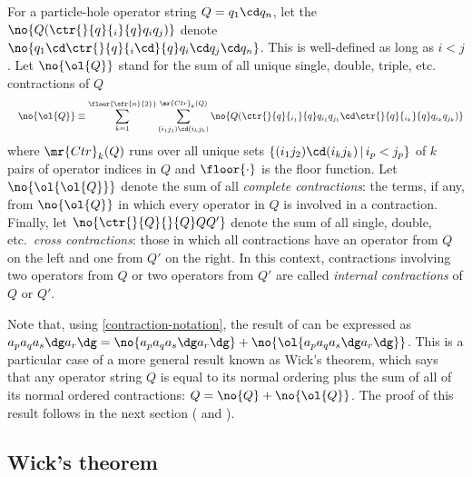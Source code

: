 \documentclass[11pt,fleqn]{article}
\numberwithin{equation}{section}
\begin{document}
\begin{ntt}\label{contraction-notation}
For a particle-hole operator string $Q=q_1\cd q_n$, let the $\no{Q(\ctr{}{q}{_i}{q}q_iq_j)}$ denote $\no{q_1\cd\ctr{}{q}{_i\cd}{q}q_i\cd q_j\cd q_n}$.
This is well-defined as long as $i<j$.
Let $\no{\ol{Q}}$ stand for the sum of all unique single, double, triple, etc. contractions of $Q$
\begin{align*}
&&
  \no{\ol{Q}}
\equiv
  \sum_{k=1}^{\floor{\sfr{n}{2}}}
  \sum_{(i_1j_1)\cd(i_kj_k)}^{\mr{Ctr}_k(Q)}
  \no{Q(
    \ctr{}{q}{_{i_1}}{q}
    q_{i_1}q_{j_1}
    \cd
    \ctr{}{q}{_{i_k}}{q}
    q_{i_k}q_{j_k}
  )}
\end{align*}
where $\mr{Ctr}_k(Q)$ runs over all unique sets $\{(i_1j_2)\cd(i_kj_k)\,|\,i_p<j_p\}$ of $k$ pairs of operator indices in $Q$ and $\floor{\cdot}$ is the floor function.
Let $\no{\ol{\ol{Q}}}$ denote the sum of all \textit{complete contractions}: the terms, if any, from $\no{\ol{Q}}$ in which every operator in $Q$ is involved in a contraction.
Finally, let $\no{\ctr{}{Q}{}{Q} QQ'}$ denote the sum of all single, double, etc.~\textit{cross contractions}: those in which all contractions have an operator from $Q$ on the left and one from $Q'$ on the right.
In this context, contractions involving two operators from $Q$ or two operators from $Q'$ are called \textit{internal contractions} of $Q$ or $Q'$.
\end{ntt}

\begin{rmk}
Note that, using \cref{contraction-notation}, the result of  can be expressed as $a_pa_qa_s\dg a_r\dg=\no{a_pa_qa_s\dg a_r\dg}+\no{\ol{a_pa_qa_s\dg a_r\dg}}$.
This is a particular case of a more general result known as Wick's theorem, which says that any operator string $Q$ is equal to its normal ordering plus the sum of all of its normal ordered contractions: $Q=\no{Q}+\no{\ol{Q}}$.
The proof of this result follows in the next section ( and ).
\end{rmk}

\subsection{Wick's theorem}
\end{document}
